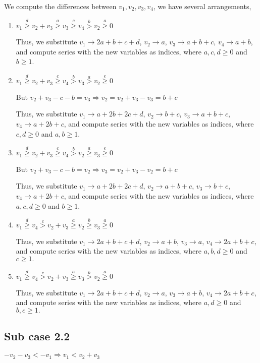 \documentclass{article}
\begin{document}
We compute the differences between $v_1,v_2,v_3,v_4$, we have several arrangements,
\begin{enumerate}
    \item 
$v_1\overset{d}{\geq}{v_2+v_3}\overset{a}{\geq}v_3\overset{c}{\geq}{v_4}\overset{b}>v_2\overset{a}{\geq}{0}$

Thus, we substitute $v_1\rightarrow{2a+b+c+d}$, $v_2\rightarrow{a}$, $v_3\rightarrow{a+b+c}$, $v_4\rightarrow{a+b}$, and compute series with the new variables as indices, where $a,c,d\geq{0}$ and $b\geq{1}$.
\item 
$v_1\overset{d}{\geq}{v_2+v_3}\overset{c}{\geq}v_4\overset{b}{>}{v_3}\overset{a}{>}v_2\overset{e}{\geq}{0}$

But $v_2+v_3-c-b=v_3\Rightarrow{v_2=v_2+v_3-v_3=b+c}$

Thus, we substitute $v_1\rightarrow{a+2b+2c+d}$, $v_2\rightarrow{b+c}$, $v_3\rightarrow{a+b+c}$, $v_4\rightarrow{a+2b+c}$, and compute series with the new variables as indices, where $c,d\geq{0}$ and $a,b\geq{1}$.

\item 
$v_1\overset{d}{\geq}{v_2+v_3}\overset{c}{\geq}v_4\overset{b}{>}{v_2}\overset{a}{\geq}v_3\overset{e}{\geq}{0}$

But $v_2+v_3-c-b=v_2\Rightarrow{v_3=v_2+v_3-v_2=b+c}$

Thus, we substitute $v_1\rightarrow{a+2b+2c+d}$, $v_2\rightarrow{a+b+c}$, $v_3\rightarrow{b+c}$, $v_4\rightarrow{a+2b+c}$, and compute series with the new variables as indices, where $a,c,d\geq{0}$ and $b\geq{1}$.

\item 
$v_1\overset{d}{\geq}{v_4}\overset{c}{>}v_2+v_3\overset{a}{\geq}{v_2}\overset{b}{\geq}v_3\overset{a}{\geq}{0}$

Thus, we substitute $v_1\rightarrow{2a+b+c+d}$, $v_2\rightarrow{a+b}$, $v_3\rightarrow{a}$, $v_4\rightarrow{2a+b+c}$, and compute series with the new variables as indices, where $a,b,d\geq{0}$ and $c\geq{1}.$

\item 
$v_1\overset{d}{\geq}{v_4}\overset{c}{>}v_2+v_3\overset{a}{\geq}{v_3}\overset{b}{>}v_2\overset{a}{\geq}{0}$

Thus, we substitute $v_1\rightarrow{2a+b+c+d}$, $v_2\rightarrow{a}$, $v_3\rightarrow{a+b}$, $v_4\rightarrow{2a+b+c}$, and compute series with the new variables as indices, where $a,d\geq{0}$ and $b,c\geq{1}.$
\end{enumerate}
\subsection{Sub case 2.2}
$-v_2-v_3<{-v_1}\Rightarrow{v_1<{v_2+v_3}}$
\end{document}
